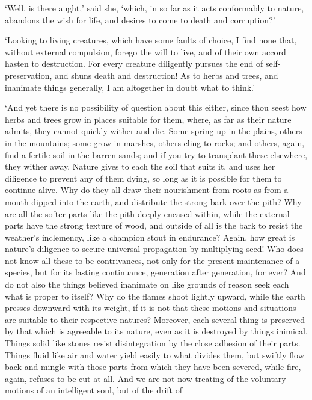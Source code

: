 \documentclass[11pt]{book}
\begin{document}
`Well, is there aught,' said she, `which, in so far as it acts
conformably to nature, abandons the wish for life, and desires to come
to death and corruption?'

`Looking to living creatures, which have some faults of choice, I find
none that, without external compulsion, forego the will to live, and of
their own accord hasten to destruction. For every creature diligently
pursues the end of self-preservation, and shuns death and destruction!
As to herbs and trees, and inanimate things generally, I am altogether
in doubt what to think.'

`And yet there is no possibility of question about this either, since
thou seest how herbs and trees grow in places suitable for them, where,
as far as their nature admits, they cannot quickly wither and die. Some
spring up in the plains, others in the mountains; some grow in marshes,
others cling to rocks; and others, again, find a fertile soil in the
barren sands; and if you try to transplant these elsewhere, they wither
away. Nature gives to each the soil that suits it, and uses her
diligence to prevent any of them dying, so long as it is possible for
them to continue alive. Why do they all draw their nourishment from
roots as from a mouth dipped into the earth, and distribute the strong
bark over the pith? Why are all the softer parts like the pith deeply
encased with\-in, while the external parts have the strong texture of
wood, and outside of all is the bark to resist the weather's
inclemency, like a champion stout in endurance? Again, how great is
nature's diligence to secure universal propagation by multiplying seed!
Who does not know all these to be contrivances, not only for the present
maintenance of a species, but for its lasting continuance, generation
after generation, for ever? And do not also the things believed
inanimate on like grounds of reason seek each what is proper to itself?
Why do the flames shoot lightly upward, while the earth presses downward
with its weight, if it is not that these motions and situations are
suitable to their respective natures? Moreover, each several thing is
preserved by that which is agreeable to its nature, even as it is
destroyed by things inimical. Things solid like stones resist
disintegration by the close adhesion of their parts. Things fluid like
air and water yield easily to what divides them, but swiftly flow back
and mingle with those parts from which they have been severed, while
fire, again, refuses to be cut at all. And we are not now treating of
the voluntary motions of an intelligent soul, but of the drift of
\end{document}
